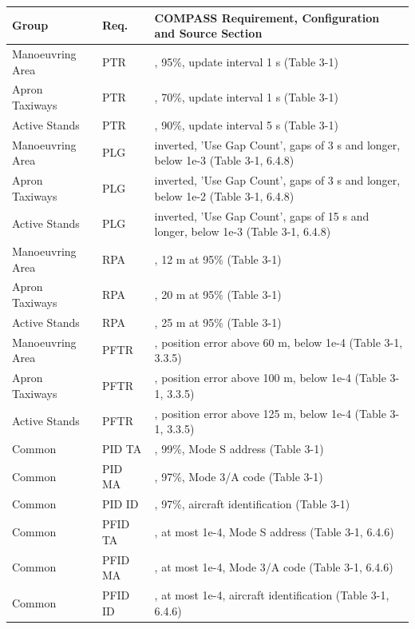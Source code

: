 \begin{center}
 \begin{table}[H]
  \begin{tabularx}{\textwidth}{ | l | l | X | }
    \hline
    \textbf{Group} & \textbf{Req.} & \textbf{COMPASS Requirement, Configuration and Source Section} \\ \hline
    Manoeuvring Area & PTR & \nameref{sec:eval_req_detection}, 95\%, update interval 1 s (Table 3-1) \\ \hline
    Apron Taxiways & PTR & \nameref{sec:eval_req_detection}, 70\%, update interval 1 s (Table 3-1) \\ \hline
    Active Stands & PTR & \nameref{sec:eval_req_detection}, 90\%, update interval 5 s (Table 3-1) \\ \hline
    Manoeuvring Area & PLG & \nameref{sec:eval_req_detection} inverted, 'Use Gap Count', gaps of 3 s and longer, below 1e-3 (Table 3-1, 6.4.8) \\ \hline
    Apron Taxiways & PLG & \nameref{sec:eval_req_detection} inverted, 'Use Gap Count', gaps of 3 s and longer, below 1e-2 (Table 3-1, 6.4.8) \\ \hline
    Active Stands & PLG & \nameref{sec:eval_req_detection} inverted, 'Use Gap Count', gaps of 15 s and longer, below 1e-3 (Table 3-1, 6.4.8) \\ \hline
    Manoeuvring Area & RPA & \nameref{sec:eval_req_pos_distance}, 12 m at 95\% (Table 3-1) \\ \hline
    Apron Taxiways & RPA & \nameref{sec:eval_req_pos_distance}, 20 m at 95\% (Table 3-1) \\ \hline
    Active Stands & RPA & \nameref{sec:eval_req_pos_distance}, 25 m at 95\% (Table 3-1) \\ \hline
    Manoeuvring Area & PFTR & \nameref{sec:eval_req_pos_distance}, position error above 60 m, below 1e-4 (Table 3-1, 3.3.5) \\ \hline
    Apron Taxiways & PFTR & \nameref{sec:eval_req_pos_distance}, position error above 100 m, below 1e-4 (Table 3-1, 3.3.5) \\ \hline
    Active Stands & PFTR & \nameref{sec:eval_req_pos_distance}, position error above 125 m, below 1e-4 (Table 3-1, 3.3.5) \\ \hline
    Common & PID TA & \nameref{sec:eval_req_id_correct}, 99\%, Mode S address (Table 3-1) \\ \hline
    Common & PID MA & \nameref{sec:eval_req_id_correct}, 97\%, Mode 3/A code (Table 3-1) \\ \hline
    Common & PID ID & \nameref{sec:eval_req_id_correct}, 97\%, aircraft identification (Table 3-1) \\ \hline
    Common & PFID TA & \nameref{sec:eval_req_id_false}, at most 1e-4, Mode S address (Table 3-1, 6.4.6) \\ \hline
    Common & PFID MA & \nameref{sec:eval_req_id_false}, at most 1e-4, Mode 3/A code (Table 3-1, 6.4.6) \\ \hline
    Common & PFID ID & \nameref{sec:eval_req_id_false}, at most 1e-4, aircraft identification (Table 3-1, 6.4.6) \\ \hline
\end{tabularx}
\end{table}
\end{center}
